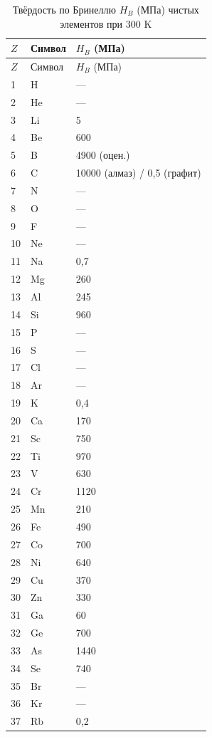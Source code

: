 \documentclass[12pt,a4paper]{article}
\begin{document}
	\begin{longtable}{p{0.6cm}p{1.2cm}p{2.5cm}}
		\caption{Твёрдость по Бринеллю \(H_B\) (МПа) чистых элементов при 300 K} \label{tab:hardness-all} \\
		\toprule
		\(Z\) & Символ & \(H_B\) (МПа) \\
		\midrule
		\endfirsthead
		\toprule
		\(Z\) & Символ & \(H_B\) (МПа) \\
		\midrule
		\endhead
		1  & H  & — \\
		2  & He & — \\
		3  & Li & 5 \\
		4  & Be & 600 \\
		5  & B  & 4900 (оцен.) \\
		6  & C  & 10000 (алмаз) / 0,5 (графит) \\
		7  & N  & — \\
		8  & O  & — \\
		9  & F  & — \\
		10 & Ne & — \\
		11 & Na & 0,7 \\
		12 & Mg & 260 \\
		13 & Al & 245 \\
		14 & Si & 960 \\
		15 & P  & — \\
		16 & S  & — \\
		17 & Cl & — \\
		18 & Ar & — \\
		19 & K  & 0,4 \\
		20 & Ca & 170 \\
		21 & Sc & 750 \\
		22 & Ti & 970 \\
		23 & V  & 630 \\
		24 & Cr & 1120 \\
		25 & Mn & 210 \\
		26 & Fe & 490 \\
		27 & Co & 700 \\
		28 & Ni & 640 \\
		29 & Cu & 370 \\
		30 & Zn & 330 \\
		31 & Ga & 60 \\
		32 & Ge & 700 \\
		33 & As & 1440 \\
		34 & Se & 740 \\
		35 & Br & — \\
		36 & Kr & — \\
		37 & Rb & 0,2 \\

\end{longtable}
\end{document}
